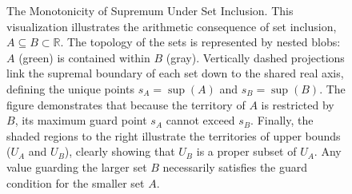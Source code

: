 \begin{figure}[H]

\caption{The Monotonicity of Supremum Under Set Inclusion.
This visualization illustrates the arithmetic consequence of set inclusion, $A \subseteq B \subset \mathbb{R}$. The topology of the sets is represented by nested blobs: $A$ (green) is contained within $B$ (gray). Vertically dashed projections link the supremal boundary of each set down to the shared real axis, defining the unique points $s_A = \operatorname{sup}(A)$ and $s_B = \operatorname{sup}(B)$. The figure demonstrates that because the territory of $A$ is restricted by $B$, its maximum guard point $s_A$ cannot exceed $s_B$. Finally, the shaded regions to the right illustrate the territories of upper bounds ($U_A$ and $U_B$), clearly showing that $U_B$ is a proper subset of $U_A$. Any value guarding the larger set $B$ necessarily satisfies the guard condition for the smaller set $A$.}
\end{figure}
